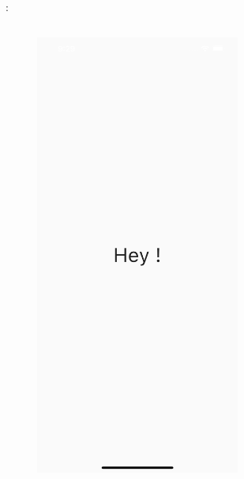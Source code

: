\documentclass[10pt]{beamer}
\begin{document}
\begin{frame}[fragile,t]{\secname : \subsecname}
\begin{columns}
\begin{column}{0.5\textwidth}
\begin{figure}
\begin{center}
                    \includegraphics[width=0.60\textwidth]{../assets/img/Scaffold.jpg}
                \end{center}
            \end{figure}\end{column}
    \end{columns}
\end{frame}
\end{document}
